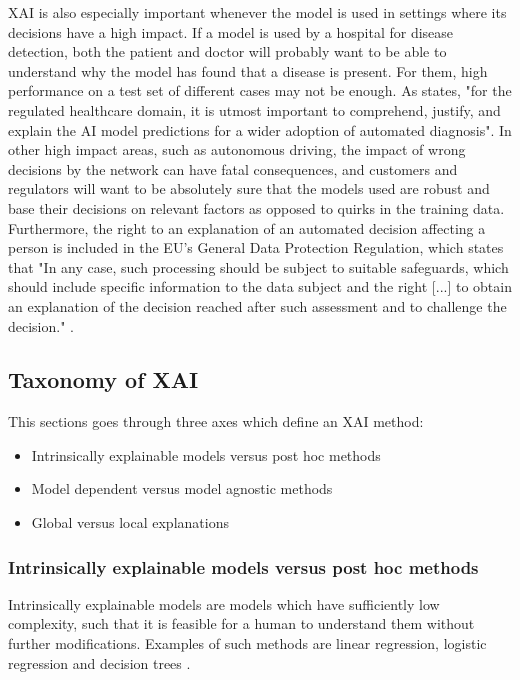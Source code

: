 \documentclass[UKenglish]{uiomasterthesis} %
\theoremstyle{definition}
\begin{document}
XAI is also especially important whenever the model is used in settings where its decisions have a high impact. If a model is used by a hospital for disease detection, both the patient and doctor will probably want to be able to understand why the model has found that a disease is present. For them, high performance on a test set of different cases may not be enough. As \cite{xaisurvey} states, "for the regulated healthcare domain, it is utmost important to comprehend, justify, and explain the AI model predictions for a wider adoption of automated diagnosis". In other high impact areas, such as autonomous driving, the impact of wrong decisions by the network can have fatal consequences, and customers and regulators will want to be absolutely sure that the models used are robust and base their decisions on relevant factors as opposed to quirks in the training data. Furthermore, the right to an explanation of an automated decision affecting a person is included in the EU's General Data Protection Regulation, which states that "In any case, such processing should be subject to suitable safeguards, which should include specific information to the data subject and the right [...] to obtain an explanation of the decision reached after such assessment and to challenge the decision." \cite{gdpr}.

\subsection{Taxonomy of XAI}

This sections goes through three axes which define an XAI method:

\begin{itemize}
  \item Intrinsically explainable models versus post hoc methods
  \item Model dependent versus model agnostic methods
  \item Global versus local explanations
\end{itemize}


\subsubsection{Intrinsically explainable models versus post hoc methods}

Intrinsically explainable models are models which have sufficiently low complexity, such that it is feasible for a human to understand them without further modifications. Examples of such methods are linear regression, logistic regression and decision trees \cite{molnar}. 
\end{document}
